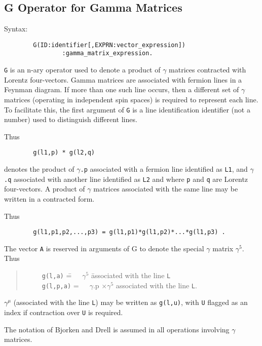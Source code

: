 \subsection{G Operator for Gamma Matrices}

Syntax:
\begin{verbatim}
        G(ID:identifier[,EXPRN:vector_expression])
                :gamma_matrix_expression.
\end{verbatim}
{\tt G} is an n-ary operator used to denote a product of $\gamma$ matrices
contracted with Lorentz four-vectors. Gamma matrices are associated with
fermion lines in a Feynman diagram. If more than one such line occurs,
then a different set of $\gamma$ matrices (operating in independent spin
spaces) is required to represent each line. To facilitate this, the first
argument of {\tt G} is a line identification identifier (not a number)
used to distinguish different lines.

Thus
\begin{verbatim}
        g(l1,p) * g(l2,q)
\end{verbatim}
denotes the product of {\tt $\gamma$.p} associated with a fermion line
identified as {\tt L1}, and {\tt $\gamma$.q} associated with another line
identified as {\tt L2} and where {\tt p} and {\tt q} are Lorentz
four-vectors.  A product of $\gamma$ matrices associated with the same
line may be written in a contracted form.

Thus
\begin{verbatim}
        g(l1,p1,p2,...,p3) = g(l1,p1)*g(l1,p2)*...*g(l1,p3) .
\end{verbatim}
The vector {\tt A} is reserved in arguments of G to denote the special
$\gamma$ matrix $\gamma^{5}$. Thus
\begin{quote}
\begin{tabbing}
\ \ \ \ \ {\tt g(l,a)}\hspace{0.2in} \= =\ \ \  $\gamma^{5}$ \hspace{0.5in}
\= associated with the line {\tt L} \\[0.1in]
\ \ \ \ \ {\tt g(l,p,a)} \> =\ \ \  $\gamma$.p $\times \gamma^{5}$ \>
associated with the line {\tt L}.
\end{tabbing}
\end{quote}
$\gamma^{\mu}$ (associated with the line {\tt L}) may be written as
{\tt g(l,u)}, with {\tt U} flagged as an index if contraction over {\tt U}
is required.

The notation of Bjorken and Drell is assumed in all operations involving
$\gamma$ matrices.

